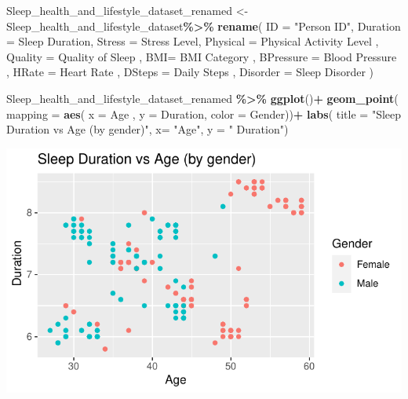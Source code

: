 \documentclass[
  11pt,
]{article}
\newenvironment{Shaded}{\begin{snugshade}}{\end{snugshade}}
\newcommand{\AttributeTok}[1]{\textcolor[rgb]{0.13,0.29,0.53}{#1}}
\newcommand{\FunctionTok}[1]{\textcolor[rgb]{0.13,0.29,0.53}{\textbf{#1}}}
\newcommand{\NormalTok}[1]{#1}
\newcommand{\OtherTok}[1]{\textcolor[rgb]{0.56,0.35,0.01}{#1}}
\newcommand{\SpecialCharTok}[1]{\textcolor[rgb]{0.81,0.36,0.00}{\textbf{#1}}}
\newcommand{\StringTok}[1]{\textcolor[rgb]{0.31,0.60,0.02}{#1}}
\begin{document}
\begin{Shaded}
\begin{Highlighting}[]
\NormalTok{Sleep\_health\_and\_lifestyle\_dataset\_renamed }\OtherTok{\textless{}{-}}\NormalTok{ Sleep\_health\_and\_lifestyle\_dataset}\SpecialCharTok{\%\textgreater{}\%}
  \FunctionTok{rename}\NormalTok{( }\AttributeTok{ID =} \StringTok{"Person ID"}\NormalTok{,}
          \AttributeTok{Duration =} \StringTok{\textquotesingle{}Sleep Duration\textquotesingle{}}\NormalTok{,}
          \AttributeTok{Stress =} \StringTok{\textquotesingle{}Stress Level\textquotesingle{}}\NormalTok{,}
          \AttributeTok{Physical =} \StringTok{\textquotesingle{}Physical Activity Level\textquotesingle{}}\NormalTok{ ,}
          \AttributeTok{Quality =} \StringTok{\textquotesingle{}Quality of Sleep\textquotesingle{}}\NormalTok{ ,}
          \AttributeTok{BMI=} \StringTok{\textquotesingle{}BMI Category\textquotesingle{}}\NormalTok{ ,}
          \AttributeTok{BPressure =} \StringTok{\textquotesingle{}Blood Pressure\textquotesingle{}}\NormalTok{ ,}
          \AttributeTok{HRate =} \StringTok{\textquotesingle{}Heart Rate\textquotesingle{}}\NormalTok{ ,}
          \AttributeTok{DSteps =} \StringTok{\textquotesingle{}Daily Steps\textquotesingle{}}\NormalTok{ ,}
          \AttributeTok{Disorder =} \StringTok{\textquotesingle{}Sleep Disorder\textquotesingle{}}\NormalTok{ )}
\end{Highlighting}
\end{Shaded}

\begin{Shaded}
\begin{Highlighting}[]
\NormalTok{Sleep\_health\_and\_lifestyle\_dataset\_renamed }\SpecialCharTok{\%\textgreater{}\%}
  \FunctionTok{ggplot}\NormalTok{()}\SpecialCharTok{+}
  \FunctionTok{geom\_point}\NormalTok{( }\AttributeTok{mapping =} \FunctionTok{aes}\NormalTok{( }\AttributeTok{x =}\NormalTok{ Age , }\AttributeTok{y =}\NormalTok{ Duration, }\AttributeTok{color =}\NormalTok{ Gender))}\SpecialCharTok{+}
  \FunctionTok{labs}\NormalTok{(}
   \AttributeTok{title =} \StringTok{"Sleep Duration vs Age (by gender)"}\NormalTok{,}
   \AttributeTok{x=} \StringTok{"Age"}\NormalTok{, }\AttributeTok{y =} \StringTok{" Duration"}\NormalTok{)}
\end{Highlighting}
\end{Shaded}

\begin{center}\includegraphics[width=0.7\linewidth]{SleepHelath_files/figure-latex/unnamed-chunk-28-1} \end{center}
\end{document}
